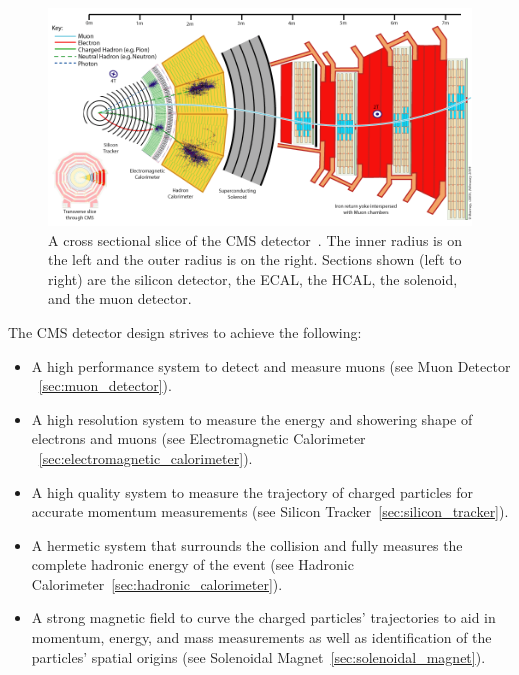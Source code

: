 		
\begin{figure}[h]
\begin{center}
\includegraphics[width=0.8\linewidth]{Figs/CMS_Slice.png}
\caption{\label{fig:cms_slice}
A cross sectional slice of the CMS detector~\cite{cmspublic}. The inner radius is on the left and the outer radius is on the right. Sections shown (left to right) are the silicon detector, the ECAL, the HCAL, the solenoid, and the muon detector.
}
\end{center}
\end{figure} 

The CMS detector design strives to achieve the following:
\begin{itemize}
\item A high performance system to detect and measure muons (see Muon Detector ~\ref{sec:muon_detector}).
\item A high resolution system to measure the energy and showering shape of electrons and muons (see Electromagnetic Calorimeter ~\ref{sec:electromagnetic_calorimeter}).
\item A high quality system to measure the trajectory of charged particles for accurate momentum measurements (see Silicon Tracker~\ref{sec:silicon_tracker}).
\item A hermetic system that surrounds the collision and fully measures the complete hadronic energy of the event (see Hadronic Calorimeter~\ref{sec:hadronic_calorimeter}).
\item A strong magnetic field to curve the charged particles' trajectories to aid in momentum, energy, and mass measurements as well as identification of the particles' spatial origins (see Solenoidal Magnet~\ref{sec:solenoidal_magnet}).
\end{itemize}

